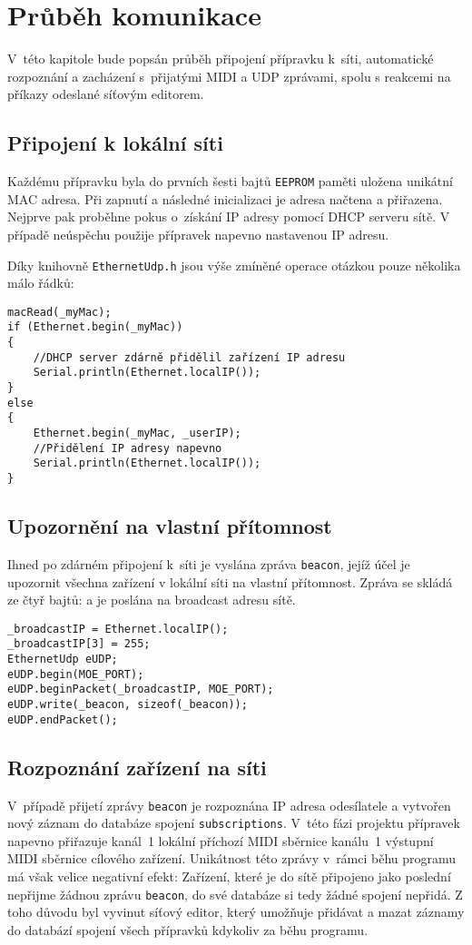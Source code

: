 \chapter{Průběh komunikace}
V~této kapitole bude popsán průběh připojení přípravku k~síti, automatické rozpoznání a zacházení s~přijatými \acs{MIDI} a \acs{UDP} zprávami, spolu s reakcemi na příkazy odeslané síťovým editorem.

\section{Připojení k lokální síti}
Každému přípravku byla do prvních šesti bajtů \texttt{EEPROM} paměti uložena unikátní MAC adresa. Při zapnutí a následné inicializaci je adresa načtena a přiřazena. Nejprve pak proběhne pokus o~získání IP adresy pomocí DHCP serveru sítě. V případě neúspěchu použije přípravek napevno nastavenou IP adresu. 

Díky knihovně \texttt{EthernetUdp.h} jsou výše zmíněné operace otázkou pouze několika málo řádků:

\begin{lstlisting}
macRead(_myMac);
if (Ethernet.begin(_myMac))
{
    //DHCP server zdárně přidělil zařízení IP adresu
    Serial.println(Ethernet.localIP());
}
else
{
    Ethernet.begin(_myMac, _userIP);
    //Přidělení IP adresy napevno
    Serial.println(Ethernet.localIP());
}
\end{lstlisting}

\section{Upozornění na vlastní přítomnost}
Ihned po zdárném připojení k~síti je vyslána zpráva \texttt{beacon}, jejíž účel je upozornit všechna zařízení v lokální síti na vlastní přítomnost. Zpráva se skládá ze čtyř bajtů:
a je poslána na broadcast adresu sítě.

\begin{lstlisting}
_broadcastIP = Ethernet.localIP();
_broadcastIP[3] = 255;
EthernetUdp eUDP;
eUDP.begin(MOE_PORT);
eUDP.beginPacket(_broadcastIP, MOE_PORT);
eUDP.write(_beacon, sizeof(_beacon));
eUDP.endPacket();
\end{lstlisting}

\section{Rozpoznání zařízení na síti}
V~případě přijetí zprávy \texttt{beacon} je rozpoznána IP adresa odesílatele a vytvořen nový záznam do databáze spojení \texttt{sub\-scrip\-tions}. V~této fázi projektu přípravek napevno přiřazuje kanál~1 lokální příchozí \acs{MIDI} sběrnice kanálu~1 výstupní \acs{MIDI} sběrnice cílového zařízení. Unikátnost této zprávy v~rámci běhu programu má však velice negativní efekt: Zařízení, které je do sítě připojeno jako poslední nepřijme žádnou zprávu \texttt{beacon}, do své databáze si tedy žádné spojení nepřidá. Z toho důvodu byl vyvinut síťový editor, který umožňuje přidávat a mazat záznamy do databází spojení všech přípravků kdykoliv za běhu programu. 


